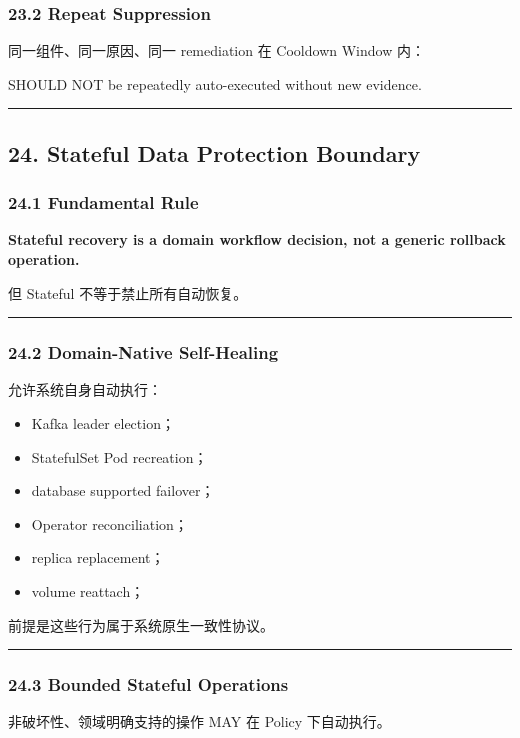 \documentclass[11pt,a4paper]{article}
\begin{document}
\subsubsection{23.2 Repeat Suppression}
同一组件、同一原因、同一 remediation 在 Cooldown Window 内：

\begin{gfmBlockquote}
SHOULD NOT be repeatedly auto-executed without new evidence.
\end{gfmBlockquote}
\vspace{0.5em}\hrule\vspace{0.5em}
\subsection{24. Stateful Data Protection Boundary}
\subsubsection{24.1 Fundamental Rule}
\begin{gfmBlockquote}
\textbf{Stateful recovery is a domain workflow decision, not a generic rollback operation.}
\end{gfmBlockquote}
但 Stateful 不等于禁止所有自动恢复。

\vspace{0.5em}\hrule\vspace{0.5em}
\subsubsection{24.2 Domain-Native Self-Healing}
允许系统自身自动执行：

\begin{itemize}
  \item Kafka leader election；
  \item StatefulSet Pod recreation；
  \item database supported failover；
  \item Operator reconciliation；
  \item replica replacement；
  \item volume reattach；
\end{itemize}
前提是这些行为属于系统原生一致性协议。

\vspace{0.5em}\hrule\vspace{0.5em}
\subsubsection{24.3 Bounded Stateful Operations}
非破坏性、领域明确支持的操作 MAY 在 Policy 下自动执行。
\end{document}
